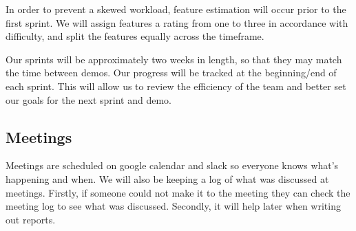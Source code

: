 \documentclass[onecolumn]{IEEEtran}
\begin{document}
In order to prevent a skewed workload, feature estimation will occur prior to the first sprint. We will assign features a rating from one to three in accordance with difficulty, and split the features equally across the timeframe.

Our sprints will be approximately two weeks in length, so that they may match the time between demos. Our progress will be tracked at the beginning/end of each sprint. This will allow us to review the efficiency of the team and better set our goals for the next sprint and demo.

\subsection{Meetings}

Meetings are scheduled on google calendar and slack so everyone knows what's happening and when. We will also be keeping a log of what was discussed at meetings. Firstly, if someone could not make it to the meeting they can check the meeting log to see what was discussed. Secondly, it will help later when writing out reports.
\end{document}
